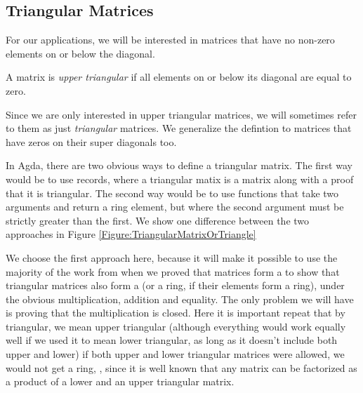 \documentclass{article}
\begin{document}
\subsection{Triangular Matrices}
For our applications, we will be interested in matrices that have no non-zero elements on or below the diagonal.
\begin{Definition}
  A matrix is \emph{upper triangular} if all elements on or below its diagonal are equal to zero.
\end{Definition}
Since we are only interested in upper triangular matrices, we will sometimes refer to them as just \emph{triangular} matrices. We generalize the defintion to matrices that have zeros on their super diagonals too.


In Agda, there are two obvious ways to define a triangular matrix. The first way would be to use records, where a triangular matix is a matrix along with a proof that it is triangular. The second way would be to use functions that take two arguments and return a ring element, but where the second argument must be strictly greater than the first. We show one difference between the two approaches in Figure \ref{Figure:TriangularMatrixOrTriangle}
\begin{figure}
  \centering
\end{figure}

We choose the first approach here, because it will make it possible to use the majority of the work from when we proved that matrices form a \nanring to show that triangular matrices also form a \nanring (or a ring, if their elements form a ring), under the obvious multiplication, addition and equality. The only problem we will have is proving that the multiplication is closed. Here it is important repeat that by triangular, we mean upper triangular (although everything would work equally well if we used it to mean lower triangular, as long as it doesn't include both upper and lower) if both upper and lower triangular matrices were allowed, we would not get a ring, , since it is well known that any matrix can be factorized as a product of a lower and an upper triangular matrix.
\end{document}
